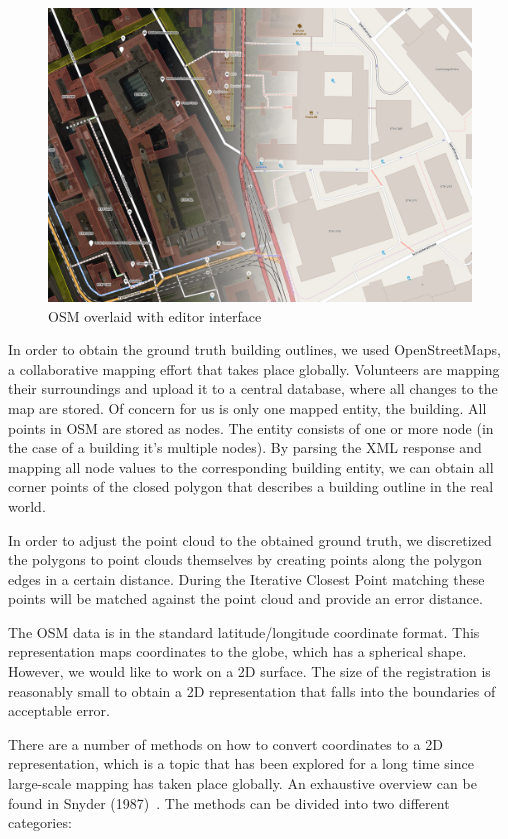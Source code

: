 \documentclass[10pt,twocolumn,letterpaper]{article}
\begin{document}
\begin{figure}[h]
   \centering
   \includegraphics[width=\linewidth]{images/osm_map.png}
   \caption{OSM overlaid with editor interface}
   \label{fig:figure1}
\end{figure}

In order to obtain the ground truth building outlines, we used OpenStreetMaps, a collaborative mapping effort that takes place globally. Volunteers are mapping their surroundings and upload it to a central database, where all changes to the map are stored. 
Of concern for us is only one mapped entity, the building. All points in OSM are stored as nodes. The entity consists of one or more node (in the case of a building it's multiple nodes). By parsing the XML response and mapping all node values to the corresponding building entity, we can obtain all corner points of the closed polygon that describes a building outline in the real world.

In order to adjust the point cloud to the obtained ground truth, we discretized the polygons to point clouds themselves by creating points along the polygon edges in a certain distance. During the Iterative Closest Point matching these points will be matched against the point cloud and provide an error distance.

The OSM data is in the standard latitude/longitude coordinate format. This representation maps coordinates to the globe, which has a spherical shape. However, we would like to work on a 2D surface. The size of the registration is reasonably small to obtain a 2D representation that falls into the boundaries of acceptable error.

There are a number of methods on how to convert coordinates to a 2D representation, which is a topic that has been explored for a long time since large-scale mapping has taken place globally. An exhaustive overview can be found in Snyder (1987)~\cite{Snyder1987}. The methods can be divided into two different categories:
\end{document}
